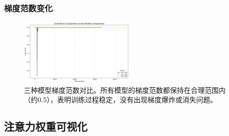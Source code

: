 \documentclass{article}
\begin{document}
\vspace{0.5cm}

\subsubsection{梯度范数变化}
\begin{figure}[h]
\centering
\includegraphics[width=0.5\textwidth]{../visualize/metrics/grad_norm_comparison.png}
\caption{三种模型梯度范数对比。所有模型的梯度范数都保持在合理范围内（约0.5），表明训练过程稳定，没有出现梯度爆炸或消失问题。}
\label{fig:grad_norm}
\end{figure}

\vspace{0.5cm}

\subsection{注意力权重可视化}
\end{document}
